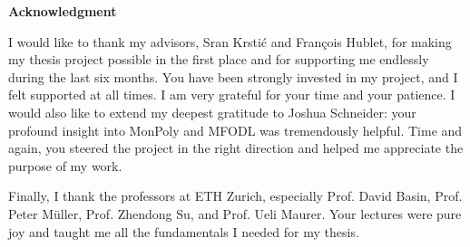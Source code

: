 \newenvironment{acknowledgement}[1]{%
  \begin{center}\normalfont\textbf{Acknowledgment}\end{center}
}{%
  \vspace{1cm}
}

\newpage
\begin{acknowledgement}
  I
  I would like to thank my advisors, Sr\dj{}an Krsti\'c and François Hublet, for making my thesis project possible in the first place and for supporting me endlessly during the last six months. You have been strongly invested in my project, and I felt supported at all times. I am very grateful for your time and your patience.
  I would also like to extend my deepest gratitude to Joshua Schneider: your profound insight into MonPoly and MFODL was tremendously helpful. Time and again, you steered the project in the right direction and helped me appreciate the purpose of my work.

  Finally, I thank the professors at ETH Zurich, especially Prof. David Basin, Prof. Peter Müller, Prof. Zhendong Su, and Prof. Ueli Maurer. Your lectures were pure joy and taught me all the fundamentals I needed for my thesis.
\end{acknowledgement}
